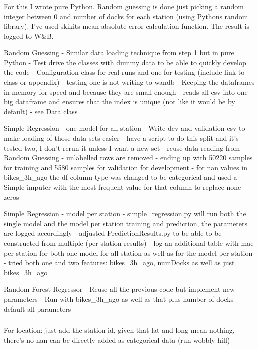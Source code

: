 \documentclass[a4paper]{article}
\begin{document}
    \subsubsection*{}
    For this I wrote pure Python. Random guessing is done just picking a random integer between 0 and number of docks
    for each station (using Pythons random library). I've used skikits mean absolute error calculation function. The result
    is logged to W&B.

    Random Guessing
    - Similar data loading technique from step 1 but in pure Python
    - Test drive the classes with dummy data to be able to quickly develop the code
    - Configuration class for real runs and one for testing  (include link to class or appendix)
    - testing one is not writing to wandb
    - Keeping the dataframes in memory for speed and because they are small enough
    -  reads all csv into one big dataframe and ensures that the index is unique (not like it would be by default) - see Data class

    Simple Regression - one model for all station
    - Write dev and validation csv to make loading of those data sets easier
    - have a script to do this split and it's tested two, I don't rerun it unless I want a new set
    - reuse data reading from Random Guessing
    - unlabelled rows are removed
    - ending up with 50220 samples for training and 5580 samples for validation for development
    - for nan values in bikes\_3h\_ago the df column type was changed to be categorical and used a Simple imputer
    with the most frequent value for that column to replace none zeros


    Simple Regression - model per station
    - simple\_regression.py will run both the single model and the model per station training and prediction, the parameters are logged
    accordingly
    - adjusted PredictionResults.py to be able to be constructed from multiple (per station results)
    - log an additional table with mae per station for both one model for all station as well as for the model per station
    - tried both one and two features: bikes\_3h\_ago, numDocks as well as just bikes\_3h\_ago

    Random Forest Regressor
    - Reuse all the previous code but implement new parameters
    - Run with bikes\_3h\_ago as well as that plus number of docks
    - default all parameters

    \subsubsection*{}
    For location: just add the station id, given that lat and long mean nothing, there's no nan can be directly added
    as categorical data
    (run wobbly hill)
\end{document}
